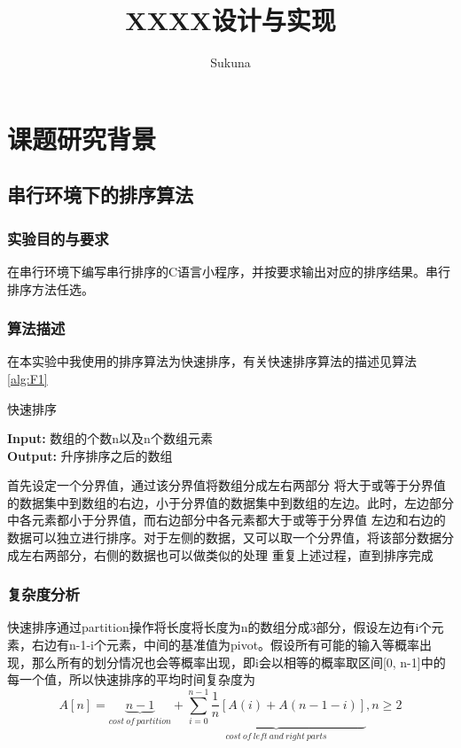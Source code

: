 \documentclass[supercite]{Experimental_Report}
\title{XXXX设计与实现}
\author{Sukuna}
\theoremstyle{definition}
\begin{document}
\maketitle
\clearpage


\section{课题研究背景}
\subsection{串行环境下的排序算法}
\subsubsection{实验目的与要求}

在串行环境下编写串行排序的C语言小程序，并按要求输出对应的排序结果。串行排序方法任选。

\subsubsection{算法描述}
在本实验中我使用的排序算法为快速排序，有关快速排序算法的描述见算法\ref{alg:F1}
\begin{algorithm}[htb]
\caption{快速排序}
\label{alg:F1}
\hspace*{0.02in} {\bf Input:}
数组的个数n以及n个数组元素\\
\hspace*{0.02in} {\bf Output:} 
升序排序之后的数组
\begin{algorithmic}[1] 
\State 首先设定一个分界值，通过该分界值将数组分成左右两部分
\State 将大于或等于分界值的数据集中到数组的右边，小于分界值的数据集中到数组的左边。此时，左边部分中各元素都小于分界值，而右边部分中各元素都大于或等于分界值
\State 左边和右边的数据可以独立进行排序。对于左侧的数据，又可以取一个分界值，将该部分数据分成左右两部分，右侧的数据也可以做类似的处理
\State 重复上述过程，直到排序完成
\end{algorithmic}
\end{algorithm}

\subsubsection{复杂度分析}
快速排序通过partition操作将长度将长度为n的数组分成3部分，假设左边有i个元素，右边有n-1-i个元素，中间的基准值为pivot。假设所有可能的输入等概率出现，那么所有的划分情况也会等概率出现，即i会以相等的概率取区间[0, n-1]中的每一个值，所以快速排序的平均时间复杂度为
$$ A[n] = \underbrace{n-1}_{cost \ of \ partition}+\underbrace{\sum_{i = 0}^{n-1}\frac{1}{n}[A(i) + A(n-1-i)]}_{cost \ of \ left \ and \ right \ parts},n \ge 2 $$
\end{document}
